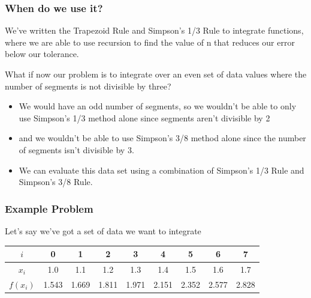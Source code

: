 \documentclass{if-beamer}
\begin{document}
\begin{frame}
	\frametitle{When do we use it?}
	We've written the Trapezoid Rule and Simpson's 1/3 Rule to integrate functions, where we are able to use recursion to find the value of n that reduces our error below our tolerance.\\\vspace{10pt}
	
	What if now our problem is to integrate over an even set of data values where the number of segments is not divisible by three?
	\begin{itemize}
		\item We would have an odd number of segments, so we wouldn't be able to only use Simpson's 1/3 method alone since segments aren't divisible by 2 
		\item and we wouldn't be able to use Simpson's 3/8 method alone since the number of segments isn't divisible by 3.
		\item We can evaluate this data set using a combination of Simpson's 1/3 Rule and Simpson's 3/8 Rule. 
	\end{itemize}   
\end{frame}

\begin{frame}
	\frametitle{Example Problem}
	Let's say we've got a set of data we want to integrate
	\begin{table}
		\begin{tabular}{c| c c c c c c c c}
		$i$ &0& 1&2&3&4&5&6&7 \\
		\hline
		$x_i$& 1.0 &1.1&1.2&1.3&1.4&1.5&1.6&1.7\\
		$f(x_i)$&1.543&1.669&1.811&1.971&2.151&2.352&2.577&2.828\\

		\end{tabular}
	\end{table}
\end{frame}
\end{document}

